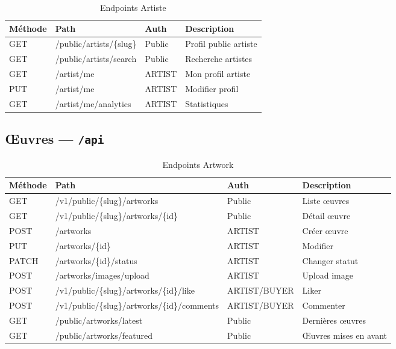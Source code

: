 \begin{longtable}{@{}llll@{}}
  \caption{Endpoints Artiste} \label{tab:api-artist} \\
  \toprule
  \textbf{Méthode} & \textbf{Path} & \textbf{Auth} & \textbf{Description} \\
  \midrule
  \endfirsthead
  GET  & /public/artists/\{slug\}       & Public  & Profil public artiste \\
  GET  & /public/artists/search         & Public  & Recherche artistes \\
  GET  & /artist/me                     & ARTIST  & Mon profil artiste \\
  PUT  & /artist/me                     & ARTIST  & Modifier profil \\
  GET  & /artist/me/analytics           & ARTIST  & Statistiques \\
  \bottomrule
\end{longtable}

\subsection{Œuvres — \texttt{/api}}

\begin{longtable}{@{}llll@{}}
  \caption{Endpoints Artwork} \label{tab:api-artwork} \\
  \toprule
  \textbf{Méthode} & \textbf{Path} & \textbf{Auth} & \textbf{Description} \\
  \midrule
  \endfirsthead
  GET    & /v1/public/\{slug\}/artworks           & Public       & Liste œuvres \\
  GET    & /v1/public/\{slug\}/artworks/\{id\}     & Public       & Détail œuvre \\
  POST   & /artworks                               & ARTIST       & Créer œuvre \\
  PUT    & /artworks/\{id\}                        & ARTIST       & Modifier \\
  PATCH  & /artworks/\{id\}/status                  & ARTIST       & Changer statut \\
  POST   & /artworks/images/upload                 & ARTIST       & Upload image \\
  POST   & /v1/public/\{slug\}/artworks/\{id\}/like  & ARTIST/BUYER & Liker \\
  POST   & /v1/public/\{slug\}/artworks/\{id\}/comments & ARTIST/BUYER & Commenter \\
  GET    & /public/artworks/latest                 & Public       & Dernières œuvres \\
  GET    & /public/artworks/featured               & Public       & Œuvres mises en avant \\
  \bottomrule
\end{longtable}

